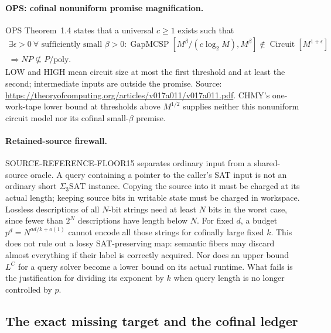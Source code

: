 \documentclass[11pt]{article}
\begin{document}
\paragraph{OPS: cofinal nonuniform promise magnification.}
OPS Theorem~1.4 states that a universal $c\geq1$ exists such that
\[
 \begin{gathered}
 \exists\epsilon>0\ \forall\text{ sufficiently small }\beta>0:
 \operatorname{GapMCSP}[M^\beta/(c\log_2M),M^\beta]
 \notin\operatorname{Circuit}[M^{1+\epsilon}]\\
 \Longrightarrow NP\not\subseteq P/\mathrm{poly}.
 \end{gathered}
\]
LOW and HIGH mean circuit size at most the first threshold and at least the
second; intermediate inputs are outside the promise. Source:
\url{https://theoryofcomputing.org/articles/v017a011/v017a011.pdf}.
CHMY's one-work-tape lower bound at thresholds above $M^{1/2}$ supplies
neither this nonuniform circuit model nor its cofinal small-$\beta$ premise.

\paragraph{Retained-source firewall.}
SOURCE-REFERENCE-FLOOR15 separates ordinary input from a shared-source
oracle. A query containing a pointer to the caller's SAT input is not an
ordinary short $\Sigma_3\mathrm{SAT}$ instance. Copying the source into it
must be charged at its actual length; keeping source bits in writable state
must be charged in workspace. Lossless descriptions of all $N$-bit strings
need at least $N$ bits in the worst case, since fewer than $2^N$ descriptions
have length below $N$. For fixed $d$, a budget
$p^d=N^{ad/k+o(1)}$ cannot encode all those strings for cofinally large fixed
$k$. This does not rule out a lossy SAT-preserving map: semantic fibers may
discard almost everything if their label is correctly acquired. Nor does an
upper bound $L^C$ for a query solver become a lower bound on its actual
runtime. What fails is the justification for dividing its exponent by $k$
when query length is no longer controlled by $p$.

\subsection{The exact missing target and the cofinal ledger}
\end{document}

